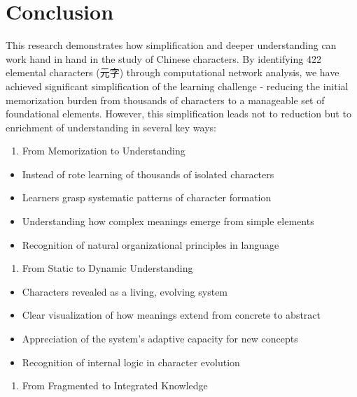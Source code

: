 \documentclass[11pt,letterpaper]{article}
\begin{document}
\section{Conclusion}\label{conclusion}

This research demonstrates how simplification and deeper understanding
can work hand in hand in the study of Chinese characters. By identifying
422 elemental characters (元字) through computational network analysis,
we have achieved significant simplification of the learning challenge -
reducing the initial memorization burden from thousands of characters to
a manageable set of foundational elements. However, this simplification
leads not to reduction but to enrichment of understanding in several key
ways:

\begin{enumerate}
\def\labelenumi{\arabic{enumi}.}
\tightlist
\item
  From Memorization to Understanding
\end{enumerate}

\begin{itemize}
\tightlist
\item
  Instead of rote learning of thousands of isolated characters
\item
  Learners grasp systematic patterns of character formation
\item
  Understanding how complex meanings emerge from simple elements
\item
  Recognition of natural organizational principles in language
\end{itemize}

\begin{enumerate}
\def\labelenumi{\arabic{enumi}.}
\setcounter{enumi}{1}
\tightlist
\item
  From Static to Dynamic Understanding
\end{enumerate}

\begin{itemize}
\tightlist
\item
  Characters revealed as a living, evolving system
\item
  Clear visualization of how meanings extend from concrete to abstract
\item
  Appreciation of the system's adaptive capacity for new concepts
\item
  Recognition of internal logic in character evolution
\end{itemize}

\begin{enumerate}
\def\labelenumi{\arabic{enumi}.}
\setcounter{enumi}{2}
\tightlist
\item
  From Fragmented to Integrated Knowledge
\end{enumerate}
\end{document}
